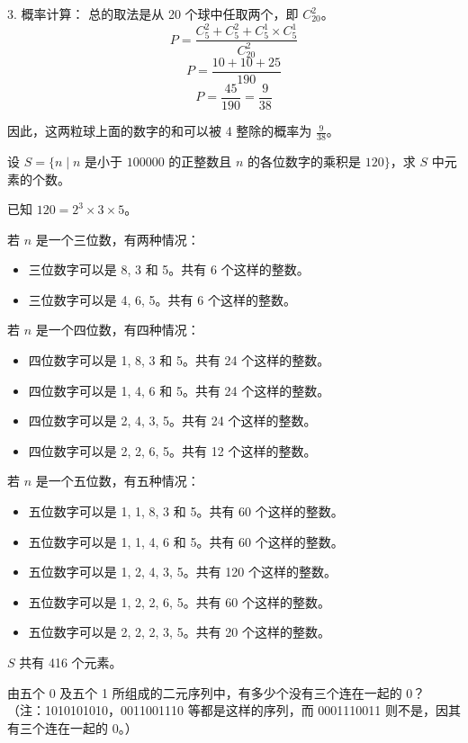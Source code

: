 \begin{questions}
\begin{solution}
3. 概率计算：
   总的取法是从 20 个球中任取两个，即 $C_{20}^2$。
   \[ P = \frac{C_5^2 + C_5^2 + C_5^1 \times C_5^1}{C_{20}^2} \]
   \[ P = \frac{10 + 10 + 25}{190} \]
   \[ P = \frac{45}{190} = \frac{9}{38} \]

因此，这两粒球上面的数字的和可以被 4 整除的概率为 $\frac{9}{38}$。
\end{solution}
\question 设 $S = \{n \mid n \text{ 是小于 100000 的正整数且 } n \text{ 的各位数字的乘积是 120}\}$，求 $S$ 中元素的个数。

\begin{solution}
已知 $120 = 2^3 \times 3 \times 5$。

若 $n$ 是一个三位数，有两种情况：
\begin{itemize}
    \item 三位数字可以是 8, 3 和 5。共有 6 个这样的整数。
    \item 三位数字可以是 4, 6, 5。共有 6 个这样的整数。
\end{itemize}

若 $n$ 是一个四位数，有四种情况：
\begin{itemize}
    \item 四位数字可以是 1, 8, 3 和 5。共有 24 个这样的整数。
    \item 四位数字可以是 1, 4, 6 和 5。共有 24 个这样的整数。
    \item 四位数字可以是 2, 4, 3, 5。共有 24 个这样的整数。
    \item 四位数字可以是 2, 2, 6, 5。共有 12 个这样的整数。
\end{itemize}

若 $n$ 是一个五位数，有五种情况：
\begin{itemize}
    \item 五位数字可以是 1, 1, 8, 3 和 5。共有 60 个这样的整数。
    \item 五位数字可以是 1, 1, 4, 6 和 5。共有 60 个这样的整数。
    \item 五位数字可以是 1, 2, 4, 3, 5。共有 120 个这样的整数。
    \item 五位数字可以是 1, 2, 2, 6, 5。共有 60 个这样的整数。
    \item 五位数字可以是 2, 2, 2, 3, 5。共有 20 个这样的整数。
\end{itemize}

$S$ 共有 416 个元素。
\end{solution}

\question 由五个 0 及五个 1 所组成的二元序列中，有多少个没有三个连在一起的 0？
（注：1010101010，0011001110 等都是这样的序列，而 0001110011 则不是，因其有三个连在一起的 0。）


\end{questions}
